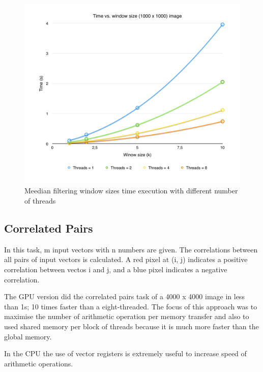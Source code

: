 \documentclass[a4paper,10pt]{article}
\begin{document}
\begin{figure}[H]
\centering
\includegraphics[width=1\textwidth]{figures/w1_timeVsSize}
\caption{Meedian filtering window sizes time execution with different number of threads}
\label{fig:pca_type}
\end{figure}

\subsection{Correlated Pairs}
In this task, m input vectors with n numbers are given. The correlations between all pairs of input vectors is calculated. A red pixel at (i, j) indicates a positive correlation between vectos i and j, and a blue pixel indicates a negative correlation. 

The GPU version did the correlated pairs task of a 4000 x 4000 image in less than 1s; 10 times faster than a eight-threaded. The focus of this approach was to maximise the number of arithmetic operation per memory transfer and also to used shared memory per block of threads because it is much more faster than the global memory. 

In the CPU the use of vector registers is extremely useful to increase speed of arithmetic operations.
\end{document}
